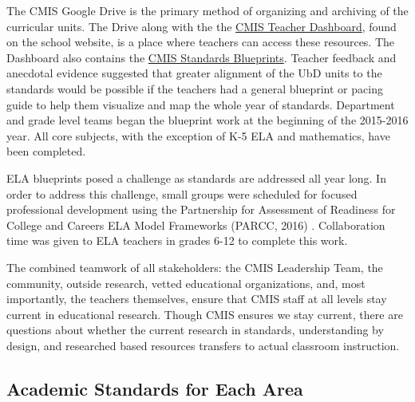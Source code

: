 \documentclass{report}
\begin{document}
\begin{findings}
The CMIS Google Drive is the primary method of organizing and archiving  of the curricular units. The Drive along with the the \href{http://www.cmis.ac.th/}{CMIS Teacher Dashboard}, found on the school website, is a place where teachers can access these resources. The Dashboard also contains the \href{https://drive.google.com/drive/folders/0ByVFfrm0zfolfmV1QTNuWFdUVHV3dDVrRFMzUFBMazY0VGs1eWc0cmFjVGcwNDdsQkdrZzA?usp=sharing}{CMIS Standards Blueprints}. Teacher feedback and anecdotal evidence suggested that greater alignment of the UbD units to the standards would be possible if the teachers had a general blueprint or pacing guide to help them visualize and map the whole year of standards. Department and grade level teams began the blueprint work at the beginning of the 2015-2016 year. All core subjects, with the exception of K-5 ELA and mathematics, have been completed. 


ELA blueprints posed a challenge as standards are addressed all year long. In order to address this challenge, small groups were scheduled for focused professional development using the Partnership for Assessment of Readiness for College and Careers ELA Model Frameworks (PARCC, 2016) . Collaboration time was given to ELA teachers in grades 6-12 to complete this work. 


The combined teamwork of all stakeholders: the CMIS Leadership Team, the community, outside research, vetted educational organizations, and, most importantly,  the teachers themselves, ensure that CMIS staff at all levels stay current in educational research. Though CMIS ensures we stay current, there are questions about whether the current research in standards, understanding by design, and researched based resources transfers to actual classroom instruction. 
\end{findings}

\subsection{Academic Standards for Each Area}

\end{document}
